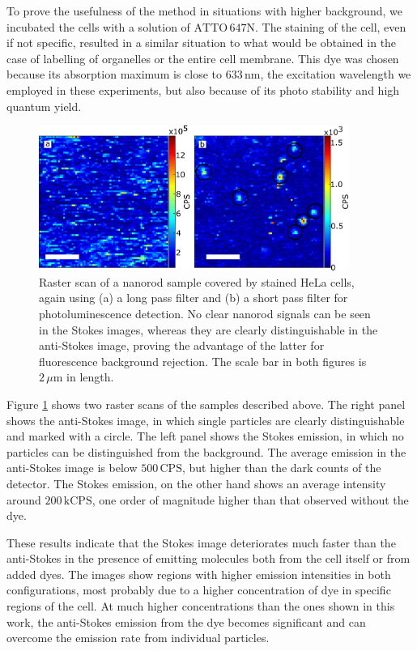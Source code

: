 \documentclass[journal=nalefd,manuscript=letter]{achemso}
\newcommand{\nm}{\ensuremath{\,\textrm{nm}}}
\newcommand{\um}{\ensuremath{\,\mu\textrm{m}}}
\newcommand{\CPS}{\ensuremath{\,\textrm{CPS}}}
\newcommand{\kCPS}{\ensuremath{\,\textrm{kCPS}}}
\newcommand{\atto}{\ensuremath{\textrm{ATTO}\,647\textrm{N}}}
\begin{document}
To prove the usefulness of the method in situations with higher background, we
incubated the cells with a solution of \atto. The staining of the cell, even if
not specific, resulted in a similar situation to what would be obtained in the
case of labelling of organelles or the entire cell membrane. This dye was chosen
because its absorption maximum is close to $633\nm$, the excitation wavelength
we employed in these experiments, but also because of its photo stability and
high quantum yield.

\begin{figure}[htp] \centering
\includegraphics[width=0.9\textwidth]{Figures/05_Stokes_AS_with_dye/stokes_as_with_dye.png}
\caption{Raster scan of a nanorod sample covered by stained HeLa cells, again
using (a) a long pass filter and (b) a short pass filter for photoluminescence
detection. No clear nanorod signals can be seen in the Stokes images, whereas
they are clearly distinguishable in the anti-Stokes image, proving the advantage
of the latter for fluorescence background rejection. The scale bar in both
figures is $2\um$ in length.}
	\label{fig:Stokes_AS_with_dye}
\end{figure}

Figure \ref{fig:Stokes_AS_with_dye} shows two raster scans of the samples
described above. The right panel shows the anti-Stokes image, in which single
particles are clearly distinguishable and marked with a circle. The left panel
shows the Stokes emission, in which no particles can be distinguished from the
background. The average emission in the anti-Stokes image is below $500\CPS$,
but higher than the dark counts of the detector. The Stokes emission, on the other
hand shows an average intensity around $200\kCPS$, one order of magnitude higher
than that observed without the dye.

These results indicate that the Stokes image deteriorates much faster than the
anti-Stokes in the presence of emitting molecules both from the cell itself or
from added dyes. The images show regions with higher emission intensities in
both configurations, most probably due to a higher concentration of dye in
specific regions of the cell. At much higher concentrations than the ones
shown in this work, the anti-Stokes emission from the dye becomes significant
and can overcome the emission rate from individual particles.
\end{document}
